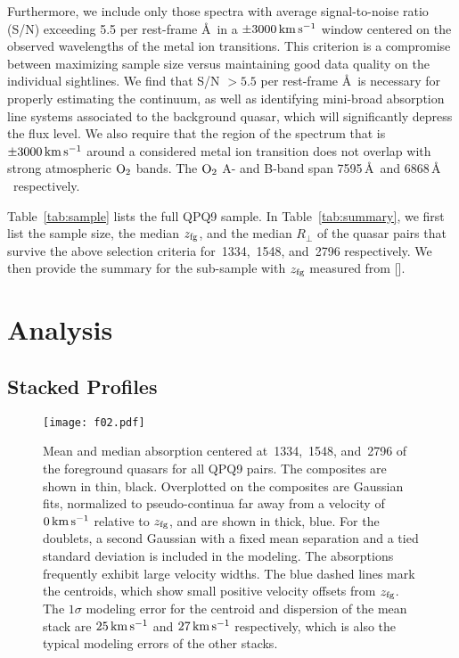 \documentclass[iop]{emulateapj}
\begin{document}
Furthermore, we include only those spectra with average signal-to-noise ratio (S/N) exceeding 5.5
per rest-frame \AA \ in a $\pm3000\,{\rm km\,s^{-1}}$ window centered on the observed wavelengths
of the metal ion transitions. This criterion is a compromise between maximizing sample size versus
maintaining good data quality on the individual sightlines. We find that S/N $>5.5$ per rest-frame
\AA \ is necessary for properly estimating the continuum, as well as identifying mini-broad
absorption line systems associated to the background quasar, which will significantly depress the
flux level. We also require that the region of the spectrum that is $\pm3000\,{\rm km\,s^{-1}}$
around a considered metal ion transition does not overlap with strong atmospheric ${\rm O}_2$
bands. The ${\rm O}_2$ A- and B-band span 7595\,\AA \ and 6868\,\AA
\ respectively.

Table~\ref{tab:sample} lists the full QPQ9 sample. In Table~\ref{tab:summary}, we first list the
sample size, the median $z_{\rm fg}$, and the median $R_\perp$ of the quasar pairs that survive
the above selection criteria for \,1334, \,1548, and \,2796
respectively. We then provide the summary for the sub-sample with $z_{\rm fg}$ measured from
[].

\section{Analysis}
\label{sec:analysis}

\subsection{Stacked Profiles}
\label{sec:stacks}

\begin{figure}
\texttt{[image: f02.pdf]}
\caption{Mean and median absorption centered at \,1334, \,1548, and
\,2796 of the foreground quasars for all QPQ9 pairs. The composites are shown in thin,
black. Overplotted on the composites are Gaussian fits, normalized to pseudo-continua far away
from a velocity of $0\,{\rm km\,s^{-1}}$ relative to $z_{\rm fg}$, and are shown in thick, blue.
For the doublets, a second Gaussian with a fixed mean separation and a tied standard deviation is
included in the modeling. The absorptions frequently exhibit large velocity widths. The blue dashed
lines mark the centroids, which show small positive velocity offsets from $z_{\rm fg}$. The
$1\sigma$ modeling error for the centroid and dispersion of the  mean stack are
$25\,{\rm km\,s^{-1}}$ and $27\,{\rm km\,s^{-1}}$ respectively, which is also the typical modeling
errors of the other stacks.
}
\label{fig:stacks_and_fits}
\end{figure}
\end{document}
